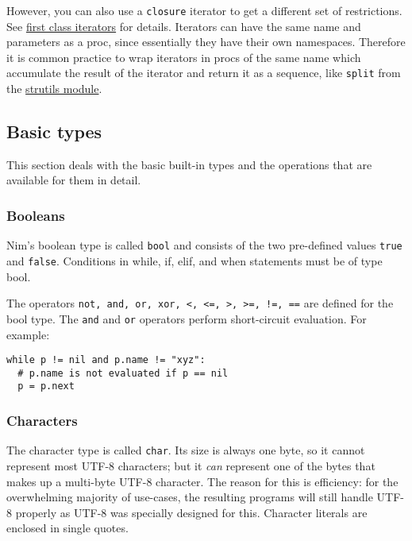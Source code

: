 However, you can also use a \texttt{closure} iterator to get a different
set of restrictions. See
\href{manual.html\#iterators-and-the-for-statement-first-class-iterators}{first
class iterators} for details. Iterators can have the same name and
parameters as a proc, since essentially they have their own namespaces.
Therefore it is common practice to wrap iterators in procs of the same
name which accumulate the result of the iterator and return it as a
sequence, like \texttt{split} from the \href{strutils.html}{strutils
module}.

\hypertarget{basic-types}{%
\subsection{Basic types}\label{basic-types}}

This section deals with the basic built-in types and the operations that
are available for them in detail.

\hypertarget{booleans}{%
\subsubsection{Booleans}\label{booleans}}

Nim's boolean type is called \texttt{bool} and consists of the two
pre-defined values \texttt{true} and \texttt{false}. Conditions in
while, if, elif, and when statements must be of type bool.

The operators
\texttt{not,\ and,\ or,\ xor,\ \textless{},\ \textless{}=,\ \textgreater{},\ \textgreater{}=,\ !=,\ ==}
are defined for the bool type. The \texttt{and} and \texttt{or}
operators perform short-circuit evaluation. For example:

\begin{verbatim}
while p != nil and p.name != "xyz":
  # p.name is not evaluated if p == nil
  p = p.next
\end{verbatim}

\hypertarget{characters}{%
\subsubsection{Characters}\label{characters}}

The {character type} is called \texttt{char}. Its size is always one
byte, so it cannot represent most UTF-8 characters; but it \emph{can}
represent one of the bytes that makes up a multi-byte UTF-8 character.
The reason for this is efficiency: for the overwhelming majority of
use-cases, the resulting programs will still handle UTF-8 properly as
UTF-8 was specially designed for this. Character literals are enclosed
in single quotes.

